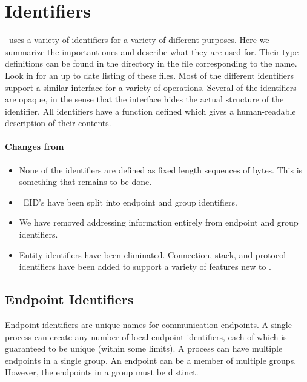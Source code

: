 %
%
%
\section{Identifiers}

\ensemble\ uses a variety of identifiers for a variety of different purposes.  Here
we summarize the important ones and describe what they are used for.  Their type
definitions can be found in the  directory in the file corresponding
to the name.  Look in  for an up to date listing of these files.
Most of the different identifiers support a similar interface for a variety of
operations.  Several of the identifiers are opaque, in the sense that the interface
hides the actual structure of the identifier.  All identifiers have a
 function defined which gives a human-readable description of
their contents.

\paragraph{Changes from \horus}
\begin{itemize}
\item
None of the identifiers are defined as fixed length sequences of bytes.  This is
something that remains to be done.
\item
\horus\ EID's have been split into endpoint and group identifiers.
\item
We have removed addressing information entirely from endpoint and group identifiers.
\item
Entity identifiers have been eliminated.  Connection, stack, and protocol identifiers
have been added to support a variety of features new to \ensemble.
\end{itemize}

\subsection{Endpoint Identifiers}
Endpoint identifiers are unique names for communication endpoints.  A single
process can create any number of local endpoint identifiers, each of which is
guaranteed to be unique (within some limits).  A process can have multiple
endpoints in a single group.  An endpoint can be a member of multiple groups.
However, the endpoints in a group must be distinct.

